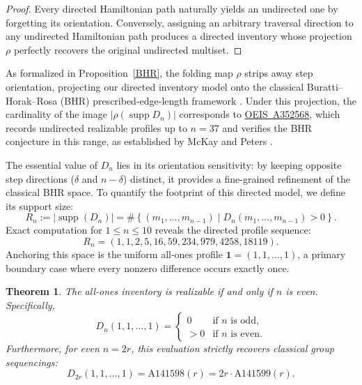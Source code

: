 \documentclass[11pt,a4paper]{amsart}
\newtheorem{theorem}{Theorem}[section]
\newtheorem{remark}[theorem]{Remark}
\newcommand{\1}{\mathbf{1}}
\begin{document}
\begin{proof}
Every directed Hamiltonian path naturally yields an undirected one by forgetting its orientation. Conversely, assigning an arbitrary traversal direction to any undirected Hamiltonian path produces a directed inventory whose projection $\rho$ perfectly recovers the original undirected multiset.
\end{proof}
As formalized in Proposition~\ref{BHR}, the folding map $\rho$ strips away step orientation, projecting our directed inventory model onto the classical Buratti--Horak--Rosa (BHR) prescribed-edge-length framework \cite{HorakRosa2009, PasottiPellegrini2014, OllisPasottiPellegriniSchmitt2021, McKayPeters2022}. Under this projection, the cardinality of the image $|\rho(\operatorname{supp} D_n)|$ corresponds to \href{https://oeis.org/A352568}{OEIS~A352568}, which records undirected realizable profiles up to $n = 37$ and verifies the BHR conjecture in this range, as established by McKay and Peters \cite[Theorem~2]{McKayPeters2022}.

The essential value of $D_n$ lies in its orientation sensitivity: by keeping opposite step directions ($\delta$ and $n-\delta$) distinct, it provides a fine-grained refinement of the classical BHR space. To quantify the footprint of this directed model, we define its support size:
\[
R_n := |\operatorname{supp}(D_n)| = \# \left\{ (m_1, \dots, m_{n-1}) \mid D_n(m_1, \dots, m_{n-1}) > 0 \right\}.
\]
Exact computation for $1 \le n \le 10$ reveals the directed profile sequence:
\[
R_n = (1, 1, 2, 5, 16, 59, 234, 979, 4258, 18119).
\]
Anchoring this space is the uniform all-ones profile $\mathbf{1} = (1, 1, \dots, 1)$, a primary boundary case where every nonzero difference occurs exactly once.
\begin{theorem}\label{BHR1}
The all-ones inventory is realizable if and only if $n$ is even. Specifically,
\begin{equation*}
    D_n(1, 1, \dots, 1) = 
    \begin{cases}
        0 & \text{if $n$ is odd,} \\
        > 0 & \text{if $n$ is even.}
    \end{cases}
\end{equation*}
Furthermore, for even $n=2r$, this evaluation strictly recovers classical group sequencings:
\begin{equation}
    D_{2r}(1, 1, \dots, 1) = \mathrm{A141598}(r) = 2r \cdot \mathrm{A141599}(r).
\end{equation}
\end{theorem}
\end{document}

